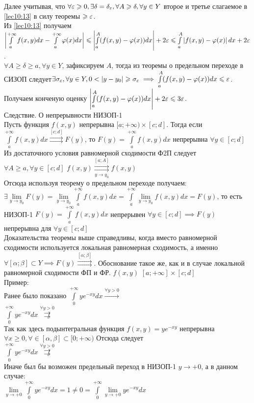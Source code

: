 \documentclass[a4paper,12pt,openany]{report}
\begin{document}
Далее учитывая, что $\forall \varepsilon \geqslant 0, \exists \delta = \delta_\varepsilon, \forall 
A \geqslant \delta, \forall y \in Y  $ второе и третье слагаемое в \eqref{lec10:13}
в силу теоремы $ \geqslant \varepsilon$.
\\
Из \eqref{lec10:13} получаем $ \left| \int\limits_{a}^{+\infty}f(x,y)dx - 
\int\limits_{a}^{+\infty}\varphi(x)dx\right| \leqslant \left| 
\int\limits_{a}^{A}(f(x,y) - \varphi(x))dx \right| + 2\varepsilon \leqslant 
\int\limits_{a}^{A}\left| f(x,y) - \varphi(x)\right|dx + 2\varepsilon  $.
\\
$ \forall A \ge \delta \ge a, \forall y \in Y$, зафиксируем $A$, тогда из 
теоремы о предельном переходе в СИЗОП следует$ \exists \sigma_\varepsilon, \forall y 
\in Y, 0 < \left|y - y_0 \right| \geqslant \sigma_\varepsilon \implies 
\int\limits_{a}^{A}(f(x,y) - \varphi(x))dx \leqslant \varepsilon   $.
\\
Получаем конченую оценку $\left| \int\limits_{a}^{A}(f(x,y) - \varphi(x))dx 
\right| + 2\varepsilon \leqslant 3\varepsilon$.
\\
Следствие. О непрерывности НИЗОП-1
\\
Пусть функция $f(x,y)$ непрерывна $[a;+\infty) \times [ c; d]$. Тогда если 
$\int\limits_a^{+\infty}f(x,y)dx \overset{[c;d]}\rightrightarrows F(y)$, то
$ F(y) = \int\limits_a^{+\infty}f(x,y)dx$ непрерывна $\forall y \in [c;d]$
Из достаточного условия равномерной сходимости Ф2П следует $\forall A \ge a, 
\forall y \in [c;d] $ $f(x,y) \overset{[a;A]}{\underset{y \to 
y_0}{\rightrightarrows}} f(x,y) $
\\
Отсюда используя теорему о предельном переходе получаем:$\exists \underset{y 
\to y_0}{\lim} F(y) = \underset{y \to y_0}\lim \int\limits_a^{+\infty}f(x,y)dx 
= \int\limits_a^{+\infty}\underset{y \to y_0}\lim f(x,y)dx = F(y) $, то есть 
НИЗОП-1 $F(y) = \int\limits_a^{+\infty}f(x,y)dx $ непрерывен $ \forall y \in 
[c;d] \implies F(y) $непрерывна для $ \forall y \in [c;d]$
\\
Доказательства теоремы выше справедливы, когда вместо равномерной сходимости 
используется локальная равномерная сходимость, а именно$\forall [\alpha;\beta] 
\subset Y \implies F(y) \overset{[\alpha;\beta]}{\rightrightarrows}$. 
Обоснование такое же, как и в случае локальной равномерной сходимости ФП и ФР.
$f(x,y)$ $[a;+\infty]\times[c;d]$
\\
Пример:
\\
Ранее было показано
$\int\limits_0^{+\infty}ye^{-xy}dx \xrightarrow{\forall y > 0}$
\\
$\int\limits_0^{+\infty}ye^{-xy}dx \overset{\forall y > 
0}{\not\rightrightarrows}$
\\
Так как здесь подынтегральная функция $f(x,y) = ye^{-xy}$ непрерывна $\forall 
x \ge 0, \forall \in [\alpha,\beta] \subset [0;+\infty)$ 
Отсюда следует
\\
$\int\limits_0^{+\infty}ye^{-xy}dx \overset{\forall y > 
0}{\not\rightrightarrows}$
\\
Иначе был бы возможен предельный переход в НИЗОП-1 $y \to +0 $, а в данном 
случае:
\\
$\underset{y \to +0}\lim\int\limits_0^{+\infty}ye^{-xy}dx = 1 \ne 0 = 
\int\limits_0^{+\infty}\underset{y \to +0}\lim ye^{-xy}dx$
\\
\\
\end{document}
